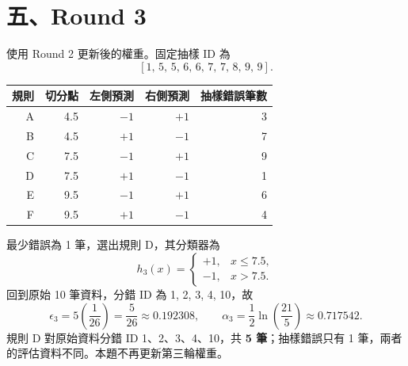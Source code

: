 \section*{五、Round 3}
使用 Round 2 更新後的權重。固定抽樣 ID 為 \[[1,\,5,\,5,\,6,\,6,\,7,\,7,\,8,\,9,\,9].\]
\begin{center}
\label{tab:round3}
\begin{tabular}{rrrrr}
\toprule
規則 & 切分點 & 左側預測 & 右側預測 & 抽樣錯誤筆數 \\
\midrule
A & 4.5 & $-1$ & $+1$ & 3 \\
B & 4.5 & $+1$ & $-1$ & 7 \\
C & 7.5 & $-1$ & $+1$ & 9 \\
D & 7.5 & $+1$ & $-1$ & 1 \\
E & 9.5 & $-1$ & $+1$ & 6 \\
F & 9.5 & $+1$ & $-1$ & 4 \\
\bottomrule
\end{tabular}
\end{center}
最少錯誤為 1 筆，選出規則 D，其分類器為
\[h_3(x)=\begin{cases}+1,&x\le 7.5,\\-1,&x>7.5.\end{cases}\]
回到原始 10 筆資料，分錯 ID 為 1, 2, 3, 4, 10，故
\[\epsilon_3=5\left(\frac1{26}\right)=\frac5{26}\approx 0.192308,\qquad \alpha_3=\frac12\ln\left(\frac{21}{5}\right)\approx 0.717542.\]
規則 D 對原始資料分錯 ID 1、2、3、4、10，共 \textbf{5 筆}；抽樣錯誤只有 1 筆，兩者的評估資料不同。本題不再更新第三輪權重。
